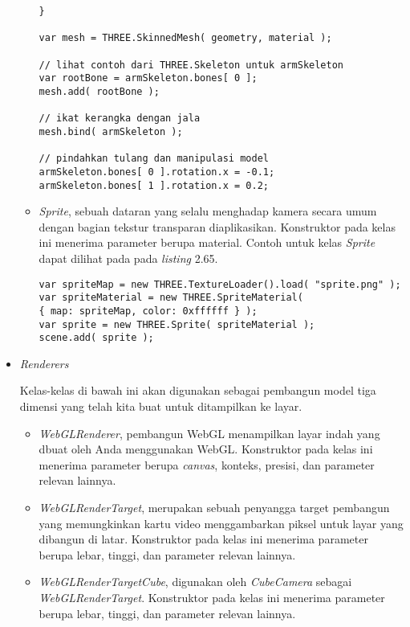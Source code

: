 \begin{itemize}
\begin{itemize}
\begin{lstlisting}[caption={Contoh penggunaan kelas {\it SkinnedMesh}.},captionpos=b]
}

var mesh = THREE.SkinnedMesh( geometry, material );

// lihat contoh dari THREE.Skeleton untuk armSkeleton
var rootBone = armSkeleton.bones[ 0 ];
mesh.add( rootBone );

// ikat kerangka dengan jala
mesh.bind( armSkeleton );

// pindahkan tulang dan manipulasi model
armSkeleton.bones[ 0 ].rotation.x = -0.1;
armSkeleton.bones[ 1 ].rotation.x = 0.2;
\end{lstlisting}
	
	\item {\it Sprite}, sebuah dataran yang selalu menghadap kamera secara umum dengan bagian tekstur transparan diaplikasikan. Konstruktor pada kelas ini menerima parameter berupa material. Contoh untuk kelas {\it Sprite} dapat dilihat pada pada {\it listing} 2.65.
	
\begin{lstlisting}[caption={Contoh penggunaan kelas {\it Sprite}.},captionpos=b]
var spriteMap = new THREE.TextureLoader().load( "sprite.png" );
var spriteMaterial = new THREE.SpriteMaterial( 
{ map: spriteMap, color: 0xffffff } );
var sprite = new THREE.Sprite( spriteMaterial );
scene.add( sprite );
\end{lstlisting}
	
	\end{itemize}

\item \textit{Renderers}

Kelas-kelas di bawah ini akan digunakan sebagai pembangun model tiga dimensi yang telah kita buat untuk ditampilkan ke layar.
	\begin{itemize}
	\item {\it WebGLRenderer}, pembangun WebGL menampilkan layar indah yang dbuat oleh Anda menggunakan WebGL. Konstruktor pada kelas ini menerima parameter berupa {\it canvas}, konteks, presisi, dan parameter relevan lainnya.
	
	\item {\it WebGLRenderTarget}, merupakan sebuah penyangga target pembangun yang memungkinkan kartu video menggambarkan piksel untuk layar yang dibangun di latar. Konstruktor pada kelas ini menerima parameter berupa lebar, tinggi, dan parameter relevan lainnya.
	
	\item {\it WebGLRenderTargetCube}, digunakan oleh {\it CubeCamera} sebagai {\it WebGLRenderTarget}. Konstruktor pada kelas ini menerima parameter berupa lebar, tinggi, dan parameter relevan lainnya.
	\end{itemize}
		

\end{itemize}
